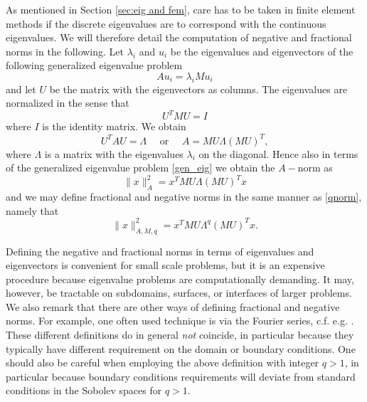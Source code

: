 As mentioned in Section \ref{sec:eig and fem}, 
care has to be taken in finite element methods if the discrete eigenvalues
are to correspond with the continuous eigenvalues. We will therefore detail
the computation of negative and fractional norms in the following.   
Let $\lambda_i$ and $u_i$ be the eigenvalues and eigenvectors of the following
generalized eigenvalue problem  
\begin{equation}
\label{gen_eig}
A u_i = \lambda_i M u_i 
\end{equation}
and let $U$ be the matrix with the eigenvectors as columns. 
The eigenvalues are normalized in the sense 
that 
\[
U^T M U = I 
\]
where $I$ is the identity matrix. 
We obtain 
\[
U^T A U = \Lambda \quad \mbox{ or } \quad A = M U \Lambda (M U)^T  ,  
\]
where $\Lambda$ is a matrix with the eigenvalues $\lambda_i$ on the diagonal.  
Hence also in terms of the generalized eigenvalue problem \eqref{gen_eig}
we obtain the $A-$norm as  
\[
\|x\|^2_A = x^T MU \Lambda (MU)^T x   
\]
and  
we may define fractional and negative norms in the same manner
as \eqref{qnorm}, namely that 
\[
\|x\|^2_{A,M,q} = x^T M U \Lambda^q (MU)^T x .     
\]

Defining the negative and fractional norms in terms of eigenvalues and eigenvectors 
is convenient for small scale problems, but it is an expensive procedure because eigenvalue problems are computationally
demanding. It may, however, be tractable on subdomains, surfaces, or interfaces 
of larger problems.   
We also remark that there are other ways of defining fractional and negative norms. For example, 
one often used technique is via the Fourier series, c.f. e.g. \cite{rauch}. These different
definitions do in general \textit{not} coincide, in particular because they typically 
have different requirement on the domain or boundary conditions. One should also
be careful when employing the above definition with integer $q>1$,    
in particular because boundary conditions requirements will deviate from 
standard conditions in the Sobolev spaces for $q>1$. 



